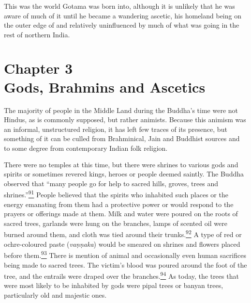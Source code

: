 This was the world Gotama was born into, although it is unlikely that he
was aware of much of it until he became a wandering ascetic, his
homeland being on the outer edge of and relatively uninfluenced by much
of what was going in the rest of northern India.

\label{footprints_split_006.html_calibre_pb_13}

\label{footprints_split_007.html}{}

\section{\texorpdfstring{{Chapter 3}\\
Gods, Brahmins and
Ascetics}{Chapter 3 Gods, Brahmins and Ascetics}}\label{footprints_split_007.html_TOCTarget3}

The majority of people in the Middle Land during the Buddha's time were
not Hindus, as is commonly supposed, but rather animists. Because this
animism was an informal, unstructured religion, it has left few traces
of its presence, but something of it can be culled from Brahminical,
Jain and Buddhist sources and to some degree from contemporary Indian
folk religion.

There were no temples at this time, but there were shrines to various
gods and spirits or sometimes revered kings, heroes or people deemed
saintly. The Buddha observed that ``many people go for help to sacred
hills, groves, trees and
shrines.''\label{footprints_split_007.html_fnref91}\hyperref[footprints_split_024.htmlux5cux23fn91]{\textsuperscript{91}}
People believed that the spirits who inhabited such places or the energy
emanating from them had a protective power or would respond to the
prayers or offerings made at them. Milk and water were poured on the
roots of sacred trees, garlands were hung on the branches, lamps of
scented oil were burned around them, and cloth was tied around their
trunks.\label{footprints_split_007.html_fnref92}\hyperref[footprints_split_024.htmlux5cux23fn92]{\textsuperscript{92}}
A type of red or ochre-coloured paste (\emph{vaṇṇaka}) would be smeared
on shrines and flowers placed before
them.\label{footprints_split_007.html_fnref93}\hyperref[footprints_split_024.htmlux5cux23fn93]{\textsuperscript{93}}
There is mention of animal and occasionally even human sacrifices being
made to sacred trees. The victim's blood was poured around the foot of
the tree, and the entrails were draped over the
branches.\label{footprints_split_007.html_fnref94}\hyperref[footprints_split_024.htmlux5cux23fn94]{\textsuperscript{94}}
As today, the trees that were most likely to be inhabited by gods were
pipal trees or banyan trees, particularly old and majestic ones.

